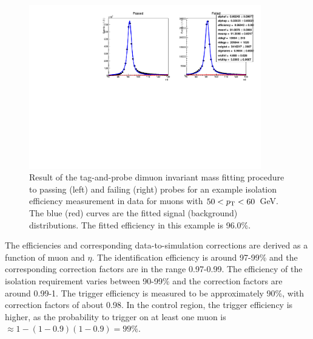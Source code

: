 \begin{figure}[h]
\label{fig:tnp}
\includegraphics[width=0.9\textwidth]{figs/analysis/muonIsolationTight_mll_all_muonDefaultPtBins_pt50-60_Data}
\caption{Result of the tag-and-probe dimuon invariant mass fitting procedure to 
passing (left) and failing (right) probes for an example isolation efficiency 
measurement in data for muons with $50<{p_{\text T}}<60$~GeV. The blue (red) curves are 
the fitted signal (background) distributions. The fitted efficiency in this 
example is 96.0\%.}
\end{figure}

The efficiencies and corresponding data-to-simulation corrections are derived 
as a function of muon \pt and $\eta$. The identification efficiency is around 
97-99\% and the corresponding correction factors are in the range 0.97-0.99. 
The efficiency 
of the isolation requirement varies between 90-99\% and the correction factors 
are around 0.99-1. The trigger efficiency is measured to be approximately 90\%, 
with correction factors of about 0.98. 
In the \mmj control region, the trigger efficiency is higher, as the 
probability to trigger on at least one muon is $\approx 1-(1-0.9)(1-0.9) = 
99\%$.

